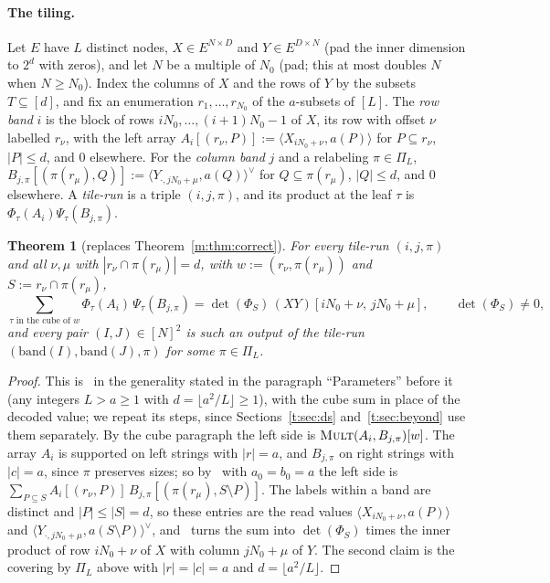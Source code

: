 \documentclass[11pt]{article}
\newtheorem{theorem}{Theorem}[section]
\theoremstyle{definition}
\theoremstyle{remark}
\newcommand{\Mult}{\textnormal{\textsc{Mult}}}
\newcommand{\Nz}{N_0}
\newcommand{\pairL}[2]{\langle #1,#2\rangle}
\newcommand{\pairR}[2]{\langle #1,#2\rangle^{\vee}}
\begin{document}
\paragraph{The tiling.} Let $E$ have $L$ distinct nodes, $X\in E^{N\times D}$ and $Y\in E^{D\times N}$ (pad the inner dimension to $2^d$ with zeros), and let $N$ be a multiple of $\Nz$ (pad; this at most doubles $N$ when $N\ge\Nz$). Index the columns of $X$ and the rows of $Y$ by the subsets $T\subseteq[d]$, and fix an enumeration $r_1,\dots,r_{\Nz}$ of the $a$-subsets of $[L]$. The \emph{row band} $i$ is the block of rows $i\Nz,\dots,(i+1)\Nz-1$ of $X$, its row with offset $\nu$ labelled $r_\nu$, with the left array $A_i[(r_\nu,P)]:=\pairL{X_{i\Nz+\nu}}{a(P)}$ for $P\subseteq r_\nu$, $|P|\le d$, and $0$ elsewhere. For the \emph{column band} $j$ and a relabeling $\pi\in\Pi_L$, $B_{j,\pi}[(\pi(r_\mu),Q)]:=\pairR{Y_{\cdot,j\Nz+\mu}}{a(Q)}$ for $Q\subseteq\pi(r_\mu)$, $|Q|\le d$, and $0$ elsewhere. A \emph{tile-run} is a triple $(i,j,\pi)$, and its product at the leaf $\tau$ is $\Phi_\tau(A_i)\Psi_\tau(B_{j,\pi})$.

\begin{theorem}[replaces Theorem~\ref{m:thm:correct}]\label{t:thm:correct}
For every tile-run $(i,j,\pi)$ and all $\nu,\mu$ with $|r_\nu\cap\pi(r_\mu)|=d$, with $w:=(r_\nu,\pi(r_\mu))$ and $S:=r_\nu\cap\pi(r_\mu)$,
\[
\sum_{\tau\text{ in the cube of }w}\Phi_\tau(A_i)\,\Psi_\tau(B_{j,\pi})=\det(\Phi_S)\,(XY)[i\Nz+\nu,\,j\Nz+\mu],\qquad\det(\Phi_S)\ne0,
\]
and every pair $(I,J)\in[N]^2$ is such an output of the tile-run $(\mathrm{band}(I),\mathrm{band}(J),\pi)$ for some $\pi\in\Pi_L$.
\end{theorem}

\begin{proof}
This is~\cite[Proposition~4.1]{Maj26b} in the generality stated in the paragraph ``Parameters'' before it (any integers $L>a\ge1$ with $d=\lfloor a^2/L\rfloor\ge1$), with the cube sum in place of the decoded value; we repeat its steps, since Sections~\ref{t:sec:ds} and~\ref{t:sec:beyond} use them separately. By the cube paragraph the left side is $\Mult(A_i,B_{j,\pi})[w]$. The array $A_i$ is supported on left strings with $|r|=a$, and $B_{j,\pi}$ on right strings with $|c|=a$, since $\pi$ preserves sizes; so by~\cite[Lemma~3.1]{Maj26b} with $a_0=b_0=a$ the left side is $\sum_{P\subseteq S}A_i[(r_\nu,P)]\,B_{j,\pi}[(\pi(r_\mu),S\setminus P)]$. The labels within a band are distinct and $|P|\le|S|=d$, so these entries are the read values $\pairL{X_{i\Nz+\nu}}{a(P)}$ and $\pairR{Y_{\cdot,j\Nz+\mu}}{a(S\setminus P)}$, and~\cite[Proposition~3.2]{Maj26b} turns the sum into $\det(\Phi_S)$ times the inner product of row $i\Nz+\nu$ of $X$ with column $j\Nz+\mu$ of $Y$. The second claim is the covering by $\Pi_L$ above with $|r|=|c|=a$ and $d=\lfloor a^2/L\rfloor$.
\end{proof}
\end{document}

